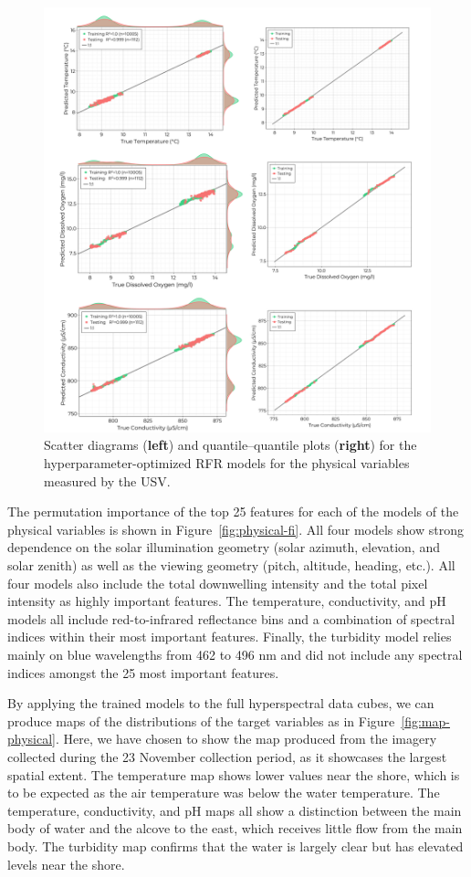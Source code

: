 \documentclass[remotesensing,article,accept,pdftex,moreauthors]{Definitions/mdpi}
\begin{document}
\begin{figure}[H]
\vspace{-0.15in}
\includegraphics[width=0.9\columnwidth]{figures/results/fits/physical-fitres.pdf}
\vspace{-0.1in}
\caption{Scatter diagrams (\textbf{left}) and quantile--quantile plots (\textbf{right}) for the hyperparameter-optimized RFR models for the physical variables measured by the USV.\label{fig:physical-fit}}
\end{figure}  

The permutation importance of the top 25 features for each of the models of the physical variables is shown in Figure~\ref{fig:physical-fi}. All four models show strong dependence on the solar illumination geometry (solar azimuth, elevation, and solar zenith) as well as the viewing geometry (pitch, altitude, heading, etc.). All four models also include the total downwelling intensity and the total pixel intensity as highly important features. The temperature, conductivity, and pH models all include red-to-infrared reflectance bins and a combination of spectral indices within their most important features. Finally, the turbidity model relies mainly on blue wavelengths from 462 to 496 nm and did not include any spectral indices amongst the 25 most important features.

By applying the trained models to the full hyperspectral data cubes, we can produce maps of the distributions of the target variables as in Figure~\ref{fig:map-physical}. Here, we have chosen to show the map produced from the imagery collected during the 23 November collection period, as it showcases the largest spatial extent. The temperature map shows lower values near the shore, which is to be expected as the air temperature was below the water temperature. The temperature, conductivity, and pH maps all show a distinction between the main body of water and the alcove to the east, which receives little flow from the main body. The turbidity map confirms that the water is largely clear but has elevated levels near the shore.
\end{document}
